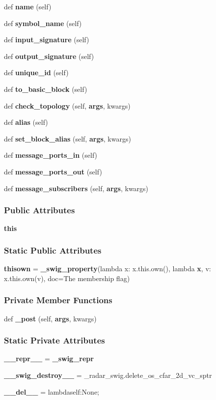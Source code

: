 \begin{DoxyCompactItemize}
def {\bf name} (self)
\item 
def {\bf symbol\+\_\+name} (self)
\item 
def {\bf input\+\_\+signature} (self)
\item 
def {\bf output\+\_\+signature} (self)
\item 
def {\bf unique\+\_\+id} (self)
\item 
def {\bf to\+\_\+basic\+\_\+block} (self)
\item 
def {\bf check\+\_\+topology} (self, {\bf args}, kwargs)
\item 
def {\bf alias} (self)
\item 
def {\bf set\+\_\+block\+\_\+alias} (self, {\bf args}, kwargs)
\item 
def {\bf message\+\_\+ports\+\_\+in} (self)
\item 
def {\bf message\+\_\+ports\+\_\+out} (self)
\item 
def {\bf message\+\_\+subscribers} (self, {\bf args}, kwargs)
\end{DoxyCompactItemize}
\subsubsection*{Public Attributes}
\begin{DoxyCompactItemize}
\item 
{\bf this}
\end{DoxyCompactItemize}
\subsubsection*{Static Public Attributes}
\begin{DoxyCompactItemize}
\item 
{\bf thisown} = {\bf \+\_\+swig\+\_\+property}(lambda x\+: x.\+this.\+own(), lambda {\bf x}, v\+: x.\+this.\+own(v), doc=\textquotesingle{}The membership flag\textquotesingle{})
\end{DoxyCompactItemize}
\subsubsection*{Private Member Functions}
\begin{DoxyCompactItemize}
\item 
def {\bf \+\_\+post} (self, {\bf args}, kwargs)
\end{DoxyCompactItemize}
\subsubsection*{Static Private Attributes}
\begin{DoxyCompactItemize}
\item 
{\bf \+\_\+\+\_\+repr\+\_\+\+\_\+} = {\bf \+\_\+swig\+\_\+repr}
\item 
{\bf \+\_\+\+\_\+swig\+\_\+destroy\+\_\+\+\_\+} = \+\_\+radar\+\_\+swig.\+delete\+\_\+os\+\_\+cfar\+\_\+2d\+\_\+vc\+\_\+sptr
\item 
{\bf \+\_\+\+\_\+del\+\_\+\+\_\+} = lambdaself\+:\+None;
\end{DoxyCompactItemize}


